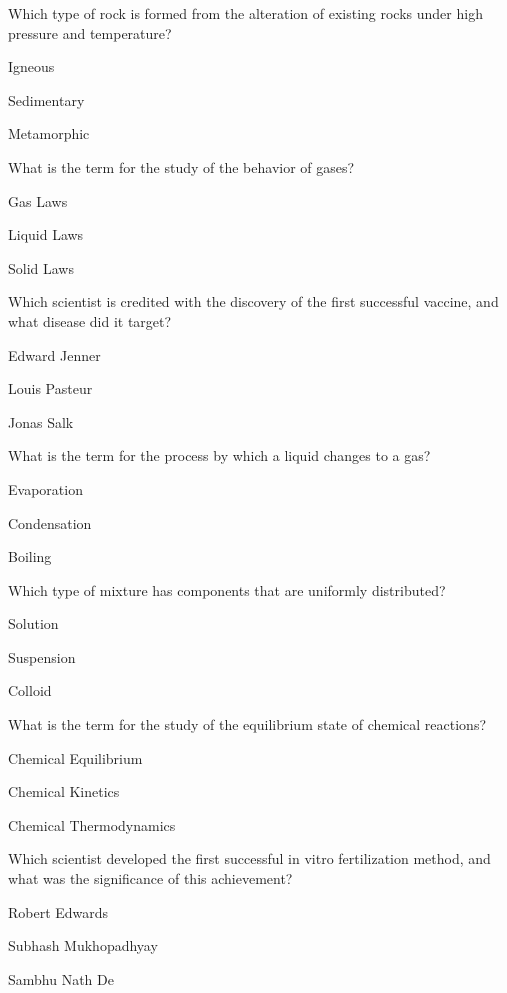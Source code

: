 \begin{enhancedmcq}{Which type of rock is formed from the alteration of existing rocks under high pressure and temperature?}
\item Igneous
\item Sedimentary
\item Metamorphic

\end{enhancedmcq}
\begin{enhancedmcq}{What is the term for the study of the behavior of gases?}
\item Gas Laws
\item Liquid Laws
\item Solid Laws

\end{enhancedmcq}
\begin{enhancedmcq}{Which scientist is credited with the discovery of the first successful vaccine, and what disease did it target?}
\item Edward Jenner
\item Louis Pasteur
\item Jonas Salk

\end{enhancedmcq}
\begin{enhancedmcq}{What is the term for the process by which a liquid changes to a gas?}
\item Evaporation
\item Condensation
\item Boiling

\end{enhancedmcq}
\begin{enhancedmcq}{Which type of mixture has components that are uniformly distributed?}
\item Solution
\item Suspension
\item Colloid

\end{enhancedmcq}
\begin{enhancedmcq}{What is the term for the study of the equilibrium state of chemical reactions?}
\item Chemical Equilibrium
\item Chemical Kinetics
\item Chemical Thermodynamics

\end{enhancedmcq}
\begin{enhancedmcq}{Which scientist developed the first successful in vitro fertilization method, and what was the significance of this achievement?}
\item Robert Edwards
\item Subhash Mukhopadhyay
\item Sambhu Nath De

\end{enhancedmcq}
